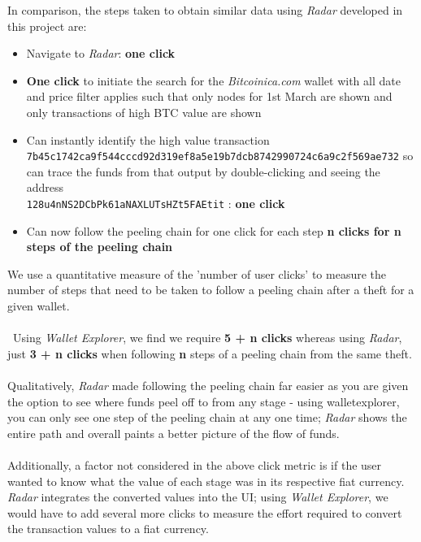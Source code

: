 In comparison, the steps taken to obtain similar data using \textit{Radar} developed in this project are:
\begin{itemize}
    \item Navigate to \textit{Radar}: \textbf{one click}
    \item \textbf{One click} to initiate the search for the \textit{Bitcoinica.com} wallet with all date and price filter applies such that only nodes for 1st March are shown and only transactions of high BTC value are shown 
    \item Can instantly identify the high value transaction \\\texttt{7b45c1742ca9f544cccd92d319ef8a5e19b7dcb8742990724c6a9c2f569ae732} so can trace the funds from that output by double-clicking and seeing the address \\\texttt{128u4nNS2DCbPk61aNAXLUTsHZt5FAEtit} : \textbf{one click}
    \item Can now follow the peeling chain for one click for each step \textbf{n clicks for n steps of the peeling chain}
\end{itemize}
We use a quantitative measure of the 'number of user clicks' to measure the number of steps that need to be taken to follow a peeling chain after a theft for a given wallet. 
\\\\\
Using \textit{Wallet Explorer}, we find we require \textbf{5 + n clicks} whereas using \textit{Radar}, just \textbf{3 + n clicks} when following \textbf{n} steps of a peeling chain from the same theft.
\\\\
Qualitatively, \textit{Radar} made following the peeling chain far easier as you are given the option to see where funds peel off to from any stage - using walletexplorer, you can only see one step of the peeling chain at any one time; \textit{Radar} shows the entire path and overall paints a better picture of the flow of funds. 
\\\\
Additionally, a factor not considered in the above click metric is if the user wanted to know what the value of each stage was in its respective fiat currency. \textit{Radar} integrates the converted values into the UI; using \textit{Wallet Explorer}, we would have to add several more clicks to measure the effort required to convert the transaction values to a fiat currency.

